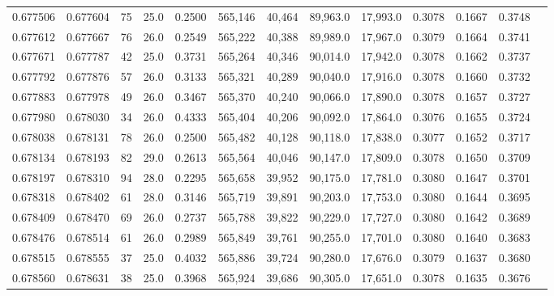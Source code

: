 \begin{tabular}{rrrrrrrrrrrrr}
0.677506 & 0.677604 &    75 & 25.0 &                                     0.2500 & 565,146 &  40,464 &  89,963.0 &  17,993.0 & 0.3078 & 0.1667 & 0.3748 \\
0.677612 & 0.677667 &    76 & 26.0 &                                     0.2549 & 565,222 &  40,388 &  89,989.0 &  17,967.0 & 0.3079 & 0.1664 & 0.3741 \\
0.677671 & 0.677787 &    42 & 25.0 &                                     0.3731 & 565,264 &  40,346 &  90,014.0 &  17,942.0 & 0.3078 & 0.1662 & 0.3737 \\
0.677792 & 0.677876 &    57 & 26.0 &                                     0.3133 & 565,321 &  40,289 &  90,040.0 &  17,916.0 & 0.3078 & 0.1660 & 0.3732 \\
0.677883 & 0.677978 &    49 & 26.0 &                                     0.3467 & 565,370 &  40,240 &  90,066.0 &  17,890.0 & 0.3078 & 0.1657 & 0.3727 \\
0.677980 & 0.678030 &    34 & 26.0 &                                     0.4333 & 565,404 &  40,206 &  90,092.0 &  17,864.0 & 0.3076 & 0.1655 & 0.3724 \\
0.678038 & 0.678131 &    78 & 26.0 &                                     0.2500 & 565,482 &  40,128 &  90,118.0 &  17,838.0 & 0.3077 & 0.1652 & 0.3717 \\
0.678134 & 0.678193 &    82 & 29.0 &                                     0.2613 & 565,564 &  40,046 &  90,147.0 &  17,809.0 & 0.3078 & 0.1650 & 0.3709 \\
0.678197 & 0.678310 &    94 & 28.0 &                                     0.2295 & 565,658 &  39,952 &  90,175.0 &  17,781.0 & 0.3080 & 0.1647 & 0.3701 \\
0.678318 & 0.678402 &    61 & 28.0 &                                     0.3146 & 565,719 &  39,891 &  90,203.0 &  17,753.0 & 0.3080 & 0.1644 & 0.3695 \\
0.678409 & 0.678470 &    69 & 26.0 &                                     0.2737 & 565,788 &  39,822 &  90,229.0 &  17,727.0 & 0.3080 & 0.1642 & 0.3689 \\
0.678476 & 0.678514 &    61 & 26.0 &                                     0.2989 & 565,849 &  39,761 &  90,255.0 &  17,701.0 & 0.3080 & 0.1640 & 0.3683 \\
0.678515 & 0.678555 &    37 & 25.0 &                                     0.4032 & 565,886 &  39,724 &  90,280.0 &  17,676.0 & 0.3079 & 0.1637 & 0.3680 \\
0.678560 & 0.678631 &    38 & 25.0 &                                     0.3968 & 565,924 &  39,686 &  90,305.0 &  17,651.0 & 0.3078 & 0.1635 & 0.3676 \\

\end{tabular}
